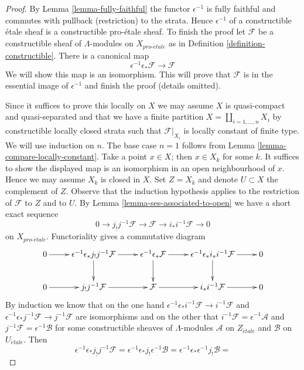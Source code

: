 \documentclass{stacks-project}
\theoremstyle{plain}
\theoremstyle{definition}
\theoremstyle{remark}
\numberwithin{equation}{subsection}
\def\proetale{{pro\text{-}\acute{e}tale}}
\def\etale{{\acute{e}tale}}
\begin{document}
\begin{proof}
By Lemma \ref{lemma-fully-faithful} the functor $\epsilon^{-1}$
is fully faithful and commutes with pullback (restriction) to
the strata. Hence $\epsilon^{-1}$ of a constructible \'etale
sheaf is a constructible pro-\'etale sheaf. To finish the
proof let $\mathcal{F}$ be a constructible sheaf of $\Lambda$-modules
on $X_\proetale$ as in Definition \ref{definition-constructible}.
There is a canonical map
$$
\epsilon^{-1}\epsilon_*\mathcal{F} \longrightarrow \mathcal{F}
$$
We will show this map is an isomorphism. This will prove that
$\mathcal{F}$ is in the essential image of $\epsilon^{-1}$
and finish the proof (details omitted).

\medskip\noindent
Since it suffices to prove this locally on $X$ we may assume $X$ is
quasi-compact and quasi-separated and that we have
a finite partition $X = \coprod_{i = 1, \ldots, n} X_i$
by constructible locally closed strata such that $\mathcal{F}|_{X_i}$
is locally constant of finite type. We will use induction on $n$.
The base case $n = 1$ follows from Lemma \ref{lemma-compare-locally-constant}.
Take a point $x \in X$; then $x \in X_k$ for some $k$.
It suffices to show the displayed map is an isomorphism in an
open neighbourhood of $x$. Hence we may assume $X_k$ is closed in $X$.
Set $Z = X_k$ and denote $U \subset X$ the complement of $Z$.
Observe that the induction hypothesis applies to the restriction of
$\mathcal{F}$ to $Z$ and to $U$. By Lemma \ref{lemma-ses-associated-to-open}
we have a short exact sequence
$$
0 \to j_!j^{-1}\mathcal{F} \to \mathcal{F} \to i_*i^{-1}\mathcal{F} \to 0
$$
on $X_\proetale$. Functoriality gives a commutative diagram
$$
\xymatrix{
0 \ar[r] &
\epsilon^{-1}\epsilon_*j_!j^{-1}\mathcal{F} \ar[r] \ar[d] &
\epsilon^{-1}\epsilon_*\mathcal{F} \ar[r] \ar[d] &
\epsilon^{-1}\epsilon_*i_*i^{-1}\mathcal{F} \ar[r] \ar[d] & 0 \\
0 \ar[r] &
j_!j^{-1}\mathcal{F} \ar[r] &
\mathcal{F} \ar[r] &
i_*i^{-1}\mathcal{F} \ar[r] & 0
}
$$
By induction we know that on the one hand
$\epsilon^{-1}\epsilon_*i^{-1}\mathcal{F} \to i^{-1}\mathcal{F}$
and
$\epsilon^{-1}\epsilon_*j^{-1}\mathcal{F} \to j^{-1}\mathcal{F}$
are isomorphisms and on the other that
$i^{-1}\mathcal{F} = \epsilon^{-1}\mathcal{A}$
and
$j^{-1}\mathcal{F} = \epsilon^{-1}\mathcal{B}$
for some constructible sheaves of $\Lambda$-modules
$\mathcal{A}$ on $Z_\etale$ and $\mathcal{B}$ on $U_\etale$.
Then
$$
\epsilon^{-1}\epsilon_*j_!j^{-1}\mathcal{F} =
\epsilon^{-1}\epsilon_*j_!\epsilon^{-1}\mathcal{B} =
\epsilon^{-1}\epsilon_*\epsilon^{-1}j_!\mathcal{B} =
$$
\end{proof}
\end{document}

